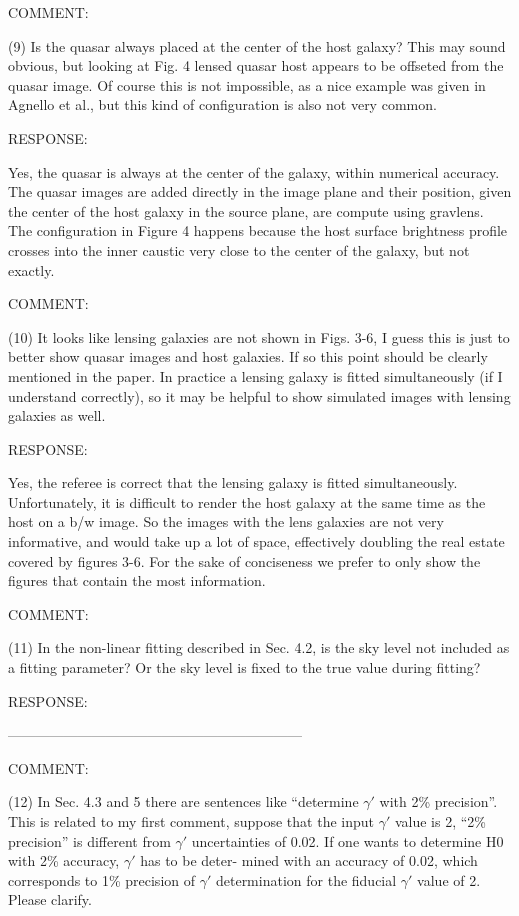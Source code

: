 \documentclass[a4paper,11pt]{article}
\begin{document}
COMMENT:

(9) Is the quasar always placed at the center of the host galaxy? This may sound obvious, but looking at Fig. 4 lensed quasar host appears to be offseted from the quasar image. Of course this is not impossible, as a nice example was given in Agnello et al., but this kind of configuration is also not very common.

RESPONSE:

Yes, the quasar is always at the center of the galaxy, within numerical accuracy. The quasar images are added directly in the image plane and their position, given the center of the host galaxy in the source plane, are compute using gravlens. The configuration in Figure 4 happens because the host surface brightness profile crosses into the inner caustic very close to the center of the galaxy, but not exactly.

COMMENT:

(10) It looks like lensing galaxies are not shown in Figs. 3-6, I guess this is just to better show quasar images and host galaxies. If so this point should be clearly mentioned in the paper. In practice a lensing galaxy is fitted simultaneously (if I understand correctly), so it may be helpful to show simulated images with lensing galaxies as well.

RESPONSE:

Yes, the referee is correct that the lensing galaxy is fitted
simultaneously. Unfortunately, it is difficult to render the host
galaxy at the same time as the host on a b/w image. So the images with
the lens galaxies are not very informative, and would take up a lot of
space, effectively doubling the real estate covered by figures
3-6. For the sake of conciseness we prefer to only show the figures
that contain the most information.

COMMENT:

(11) In the non-linear fitting described in Sec. 4.2, is the sky level not included as a fitting parameter? Or the sky level is fixed to the true value during fitting?


RESPONSE:


---------------------------------------------------------------

COMMENT:

(12) In Sec. 4.3 and 5 there are sentences like ``determine $\gamma'$
with 2\% precision''. This is related to my first comment, suppose
that the input $\gamma'$ value is 2, ``2\% precision'' is different
from $\gamma'$ uncertainties of 0.02. If one wants to determine H0
with 2\% accuracy, $\gamma'$ has to be deter- mined with an accuracy
of 0.02, which corresponds to 1\% precision of $\gamma'$ determination
for the fiducial $\gamma'$ value of 2. Please clarify.
\end{document}
